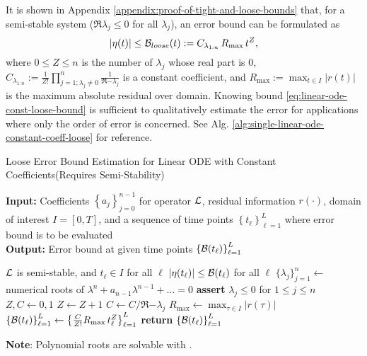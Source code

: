     It is shown in Appendix \ref{appendix:proof-of-tight-and-loose-bounds} that, for a semi-stable system ($\Re{\lambda_j} \leq 0$ for all $\lambda_j$), an error bound can be formulated as
    \begin{equation} \label{eq:linear-ode-const-loose-bound}
        \left|\eta(t)\right| \leq \mathcal{B}_{loose}(t) := C_{\lambda_{1:n}}\, R_{\max}\, t^{Z},
    \end{equation}
    where $0\leq Z \leq n$ is the number of $\lambda_j$ whose real part is $0$, $\displaystyle C_{\lambda_{1:n}} := \frac{1}{Z!}\prod_{j=1; \lambda_j\neq 0}^{n} \frac{1}{\Re{-\lambda_j}}$ is a constant coefficient, and $\displaystyle R_{\max}:=\max_{t\in I} |r(t)|$ is the maximum absolute residual over domain. 
    Knowing bound \eqref{eq:linear-ode-const-loose-bound} is sufficient to qualitatively estimate the error for applications where only the order of error is concerned. See Alg. \ref{alg:single-linear-ode-constant-coeff-loose} for reference.

    \makeatletter
    \setlength{\@fptop}{0pt}
    \begin{algorithm}
        \caption{Loose Error Bound Estimation for Linear ODE with Constant Coefficients\quad (Requires Semi-Stability)}\label{alg:single-linear-ode-constant-coeff-loose}
        \textbf{Input:} Coefficients $\left\{a_j\right\}_{j=0}^{n-1}$ for operator $\mathcal{L}$, residual information $r(\cdot)$, domain of interest $I = [0, T]$, and a sequence of time points $\left\{t_\ell\right\}_{\ell=1}^{L}$ where error bound is to be evaluated\\
        \textbf{Output:} Error bound at given time points $\left\{\mathcal{B}(t_\ell)\right\}_{\ell=1}^{L}$
        \begin{algorithmic}
            \Require $\mathcal{L}$ is semi-stable, and $t_\ell \in I$ for all $\ell$
            \Ensure $\left|\eta(t_\ell)\right| \leq \mathcal{B}(t_\ell)$ for all $\ell$
            \State $\{\lambda_j\}_{j=1}^{n} \gets$ numerical roots of $\lambda^n+a_{n-1}\lambda^{n-1}+\dots=0$ 
            \State \textbf{assert} $\lambda_j \leq 0$ for $1 \leq j \leq n$ 
            \State $Z, C \gets 0, 1$
                    \State $Z \gets Z + 1$
                \Else
                    \State $C \gets C / \Re{-\lambda_j}$
                \EndIf
            \EndFor
            \State $R_{\max} \gets \max_{\tau \in I} |r(\tau)|$ 
            \State $\left\{\mathcal{B}(t_\ell)\right\}_{\ell=1}^{L} \gets \left\{\frac{C}{Z!}R_{\max}\, t_\ell^{Z}\right\}_{\ell=1}^{L}$
            \State \textbf{return} $\left\{\mathcal{B}(t_\ell)\right\}_{\ell=1}^{L}$
        \end{algorithmic}
        \vspace{0.5em} 
        \textbf{Note}: Polynomial roots are solvable with \citeauthor{jenkins1970three} \cite{jenkins1970three}.
    \end{algorithm}
    \makeatother

